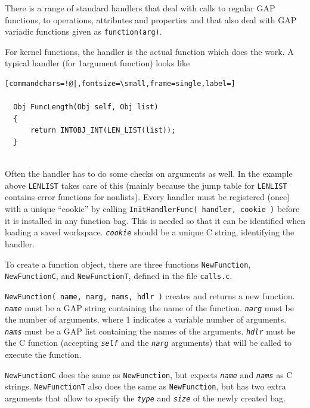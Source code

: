 \documentclass[a4paper,11pt]{report}
\begin{document}
{{{ There is a range of standard handlers that deal with calls to regular \textsf{GAP} functions, to operations, attributes and properties and that also deal with \textsf{GAP} variadic functions given as \texttt{function(arg)}. 

 For kernel functions, the handler is the actual function which does the work.
A typical handler (for 1\texttt{}argument function) looks like 
\begin{Verbatim}[commandchars=!@|,fontsize=\small,frame=single,label=]
  
  Obj FuncLength(Obj self, Obj list)
  {
      return INTOBJ_INT(LEN_LIST(list));
  }
  
\end{Verbatim}
 Often the handler has to do some checks on arguments as well. In the example
above \texttt{LEN{\textunderscore}LIST} takes care of this (mainly because the jump table for \texttt{LEN{\textunderscore}LIST} contains error functions for non\texttt{}lists). Every handler must
be registered (once) with a unique ``cookie'' by calling \texttt{InitHandlerFunc( handler, cookie )} before it is installed in any function bag. This is needed so that it can be
identified when loading a saved workspace. \mbox{\texttt{\mdseries\slshape cookie}} should be a unique \textsf{C} string, identifying the handler. 

 To create a function object, there are three functions \texttt{NewFunction}, \texttt{NewFunctionC}, and \texttt{NewFunctionT}, defined in the file \texttt{calls.c}. 

 \texttt{NewFunction( name, narg, nams, hdlr )} creates and returns a new function. \mbox{\texttt{\mdseries\slshape name}} must be a \textsf{GAP} string containing the name of the function. \mbox{\texttt{\mdseries\slshape narg}} must be the number of arguments, where \texttt{}1 indicates a
variable number of arguments. \mbox{\texttt{\mdseries\slshape nams}} must be a \textsf{GAP} list containing the names of the arguments. \mbox{\texttt{\mdseries\slshape hdlr}} must be the \textsf{C} function (accepting \mbox{\texttt{\mdseries\slshape self}} and the \mbox{\texttt{\mdseries\slshape narg}} arguments) that will be called to execute the function. 

 \texttt{NewFunctionC} does the same as \texttt{NewFunction}, but expects \mbox{\texttt{\mdseries\slshape name}} and \mbox{\texttt{\mdseries\slshape nams}} as \textsf{C} strings. \texttt{NewFunctionT} also does the same as \texttt{NewFunction}, but has two extra arguments that allow to specify the \mbox{\texttt{\mdseries\slshape type}} and \mbox{\texttt{\mdseries\slshape size}} of the newly created bag. 

}}}
\end{document}
